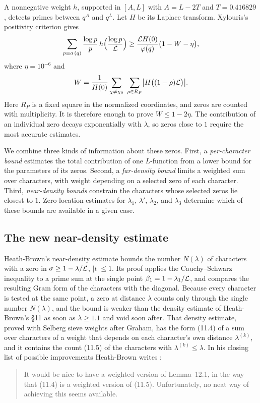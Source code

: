 A nonnegative weight $h$, supported in $[A,L]$ with $A=L-2T$ and $T=0.416829$, detects
primes between $q^A$ and $q^L$. Let $H$ be its Laplace transform. Xylouris's positivity
criterion \cite[(3.57)]{Xylouris2011nullstellen} gives
\[
  \sum_{p\equiv a\,(q)}\frac{\log p}{p}\,h\Bigl(\frac{\log p}{\mathcal{L}}\Bigr)
  \ge \frac{\mathcal{L} H(0)}{\varphi(q)}\bigl(1-W-\eta\bigr),
\]
where $\eta=10^{-6}$ and
\[
  W=\frac1{H(0)}\sum_{\chi\ne\chi_0}\ \sum_{\rho\in R_P}
       \bigl|H\bigl((1-\rho)\LL\bigr)\bigr|.
\]
Here $R_P$ is a fixed square in the normalized coordinates, and zeros are counted with
multiplicity. It is therefore enough to prove $W\le1-2\eta$. The contribution of an
individual zero decays exponentially with $\lambda$, so zeros close to $1$ require the
most accurate estimates.

We combine three kinds of information about these zeros. First, a \emph{per-character
bound} estimates the total contribution of one $L$-function from a lower bound for the
parameters of its zeros. Second, a \emph{far-density bound} limits a weighted sum over
characters, with weight depending on a selected zero of each character. Third,
\emph{near-density bounds} constrain the characters whose selected zeros lie closest to
$1$. Zero-location estimates for $\lambda_1$, $\lambda'$, $\lambda_2$, and $\lambda_3$ determine
which of these bounds are available in a given case.

\subsection{The new near-density estimate}\label{subsec:newlemma}
Heath-Brown's near-density estimate \cite[Lemma~12.1]{HeathBrown1992zero} bounds the number
$N(\lambda)$ of characters with a zero in $\sigma\ge1-\lambda/\mathcal{L}$, $|t|\le1$. Its proof applies
the Cauchy--Schwarz inequality to a prime sum at the single point $\beta_1=1-\lambda_1/\mathcal{L}$, and
compares the resulting Gram form of the characters with the diagonal. Because every character
is tested at the same point, a zero at distance $\lambda$ counts only through the single number
$N(\lambda)$, and the bound is weaker than the density estimate of Heath-Brown's \S11 as soon as
$\lambda\ge1.1$ and void soon after. That density estimate, proved with Selberg sieve weights
after Graham, has the form (11.4) of a sum over characters of a weight that depends on each
character's own distance $\lambda^{(k)}$, and it contains the count (11.5) of the characters with
$\lambda^{(k)}\le\lambda$. In his closing list of possible improvements Heath-Brown writes
\cite[\S16, item~9]{HeathBrown1992zero}:
\begin{quote}
It would be nice to have a weighted version of Lemma~12.1, in the way that (11.4) is a
weighted version of (11.5). Unfortunately, no neat way of achieving this seems available.
\end{quote}

